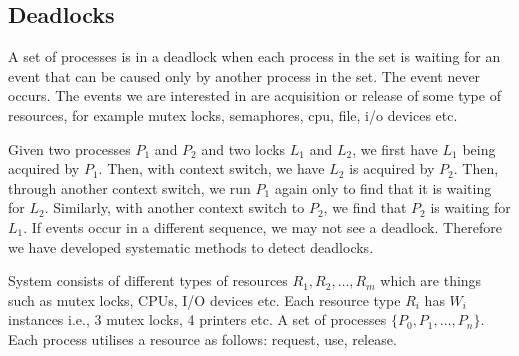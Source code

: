 \documentclass[a4paper]{article}
\theoremstyle{plain}
\theoremstyle{definition}
\newtheorem{defn}{Definition}[section]
\newtheorem{exmp}{Example}[section]
\theoremstyle{remark}
\begin{document}
\subsection{Deadlocks}
\begin{tcolorbox}[colback=black!3!white,colframe=black!60!white,title=\begin{defn}Deadlock \label{Deadlock}\end{defn}]
A set of processes is in a deadlock when each process in the set is waiting for an event that can be caused only by another process in the set. The event never occurs. The events we are interested in are acquisition or release of some type of resources, for example mutex locks, semaphores, cpu, file, i/o devices etc. 
\end{tcolorbox}
\begin{tcolorbox}[colback=black!3!white,colframe=black!60!white,title=\begin{exmp}A quick example \label{A quick example}\end{exmp}]
Given two processes $P_1$ and $P_2$ and two locks $L_1$ and $L_2$, we first have $L_1$ being acquired by $P_1$. Then, with context switch, we have $L_2$ is acquired by $P_2$. Then, through another context switch, we run $P_1$ again only to find that it is waiting for $L_2$. Similarly, with another context switch to $P_2$, we find that $P_2$ is waiting for $L_1$. If events occur in a different sequence, we may not see a deadlock. Therefore we have developed systematic methods to detect deadlocks.
\end{tcolorbox}
\begin{tcolorbox}[colback=black!3!white,colframe=black!60!white,title=\begin{defn}System Model \label{System Model}\end{defn}]
System consists of different types of resources $R_1,R_2,\ldots,R_m$ which are things such as mutex locks, CPUs, I/O devices etc. Each resource type $R_i$ has $W_i$ instances i.e., 3 mutex locks, 4 printers etc. A set of processes $\{P_0,P_1,\ldots,P_n\}$. Each process utilises a resource as follows: request, use, release.
\end{tcolorbox}
\end{document}
